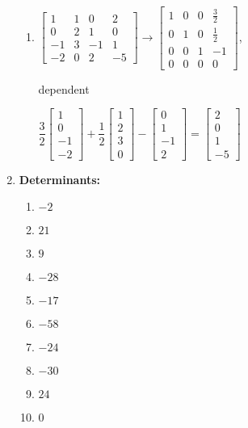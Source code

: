 \begin{multicols}{2}
\begin{enumerate}
\begin{enumerate}
	\item 
$
\begin{bmatrix}
 1 & 1 & 0 & 2 \\
 0 & 2 & 1 & 0 \\
 -1 & 3 & -1 & 1 \\
 -2 & 0 & 2 & -5
\end{bmatrix}
\rightarrow
\begin{bmatrix}
 1 & 0 & 0 & \frac{3}{2} \\
 0 & 1 & 0 & \frac{1}{2} \\
 0 & 0 & 1 & -1 \\
 0 & 0 & 0 & 0
\end{bmatrix}
$, 

dependent

$\dfrac{3}{2}\begin{bmatrix}
 1  \\
 0 \\
 -1  \\
 -2 
\end{bmatrix}
+\dfrac{1}{2}
\begin{bmatrix}
1 \\
2 \\
3 \\
0
\end{bmatrix}
-
\begin{bmatrix}
 0 \\
 1 \\
 -1 \\
 2 
\end{bmatrix}
=
\begin{bmatrix}
 2 \\
 0 \\
 1 \\
-5
\end{bmatrix}$



\end{enumerate}


\item \textbf{Determinants:}
\begin{multicols}{3}
\begin{enumerate}
	\item $-2$
	\item $21$
	\item $9$
	\item $-28$
	\item $-17$
	\item $-58$
	\item $-24$
	\item $-30$
	\item $24$
	\item $0$
\end{enumerate}
\end{multicols}





\end{enumerate}
\end{multicols}
